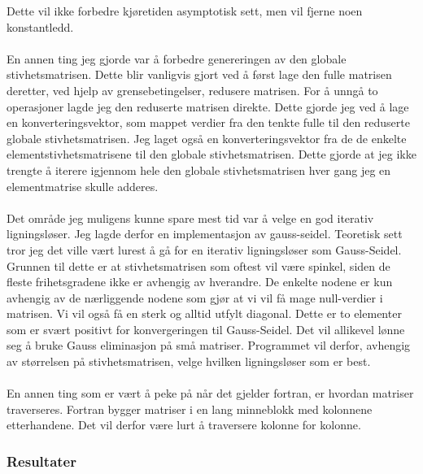 \documentclass[10pt,a4paper, norsk]{article}
\begin{document}
Dette vil ikke forbedre kjøretiden asymptotisk sett, men vil fjerne noen konstantledd.

\paragraph*{}
En annen ting jeg gjorde var å forbedre genereringen av den globale stivhetsmatrisen. Dette blir vanligvis gjort ved å først lage den fulle matrisen deretter, ved hjelp av grensebetingelser, redusere matrisen. For å unngå to operasjoner lagde jeg den reduserte matrisen direkte. Dette gjorde jeg ved å lage en konverteringsvektor, som mappet verdier fra den tenkte fulle til den reduserte globale stivhetsmatrisen. Jeg laget også en konverteringsvektor fra de de enkelte elementstivhetsmatrisene til den globale stivhetsmatrisen. Dette gjorde at jeg ikke trengte å iterere igjennom hele den globale stivhetsmatrisen hver gang jeg en elementmatrise skulle adderes. 


\paragraph*{}
Det område jeg muligens kunne spare mest tid var å velge en god iterativ ligningsløser. Jeg lagde derfor en implementasjon av gauss-seidel. Teoretisk sett tror jeg det ville vært lurest å gå for en iterativ ligningsløser som Gauss-Seidel. Grunnen til dette er at stivhetsmatrisen som oftest vil være spinkel, siden de fleste frihetsgradene ikke er avhengig av hverandre. De enkelte nodene er kun avhengig av de nærliggende nodene som gjør at vi vil få mage null-verdier i matrisen. Vi vil også få en sterk og alltid utfylt diagonal. Dette er to elementer som er svært positivt for konvergeringen til Gauss-Seidel. Det vil allikevel lønne seg å bruke Gauss eliminasjon på små matriser. Programmet vil derfor, avhengig av størrelsen på stivhetsmatrisen, velge hvilken ligningsløser som er best. 

\paragraph*{}
En annen ting som er vært å peke på når det gjelder fortran, er hvordan matriser traverseres. Fortran bygger matriser i en lang minneblokk med kolonnene etterhandene. Det vil derfor være lurt å traversere kolonne for kolonne. 





\subsubsection{Resultater}
\end{document}
